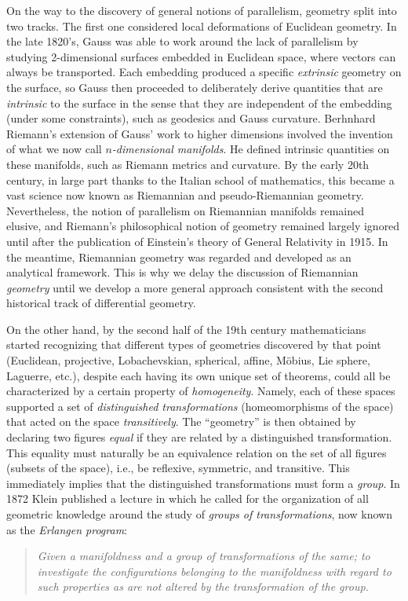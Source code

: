 \begin{hrem*}
    On the way to the discovery of general notions of parallelism, geometry split into two tracks. The first one considered local deformations of Euclidean geometry. In the late 1820's, Gauss was able to work around the lack of parallelism by studying 2-dimensional surfaces embedded in Euclidean space, where vectors can always be transported. Each embedding produced a specific \emph{extrinsic} geometry on the surface, so Gauss then proceeded to deliberately derive quantities that are \emph{intrinsic} to the surface in the sense that they are independent of the embedding (under some constraints), such as geodesics and Gauss curvature. Berhnhard Riemann's extension of Gauss' work to higher dimensions involved the invention of what we now call \emph{$n$-dimensional manifolds}. He defined intrinsic quantities on these manifolds, such as Riemann metrics and curvature. By the early 20th century, in large part thanks to the Italian school of mathematics, this became a vast science now known as Riemannian and pseudo-Riemannian geometry. Nevertheless, the notion of parallelism on Riemannian manifolds remained elusive, and Riemann's philosophical notion of geometry remained largely ignored until after the publication of Einstein's theory of General Relativity in 1915. In the meantime, Riemannian geometry was regarded and developed as an analytical framework. This is why we delay the discussion of Riemannian \emph{geometry} until we develop a more general approach consistent with the second historical track of differential geometry.

    On the other hand, by the second half of the 19th century mathematicians started recognizing that different types of geometries discovered by that point (Euclidean, projective, Lobachevskian, spherical, affine, M\"obius, Lie sphere, Laguerre, etc.), despite each having its own unique set of theorems, could all be characterized by a certain property of \emph{homogeneity}. Namely, each of these spaces supported a set of \emph{distinguished transformations} (homeomorphisms of the space) that acted on the space \emph{transitively}. The ``geometry'' is then obtained by declaring two figures \emph{equal} if they are related by a distinguished transformation. This equality must naturally be an equivalence relation on the set of all figures (subsets of the space), i.e., be reflexive, symmetric, and transitive. This immediately implies that the distinguished transformations must form a \emph{group}. In 1872 Klein published a lecture in which he called for the organization of all geometric knowledge around the study of \emph{groups of transformations}, now known as the \emph{Erlangen program}:
    \begin{quote}
        \small
        \emph{Given a manifoldness and a group of transformations of the same; to investigate the configurations belonging to the manifoldness with regard to such properties as are not altered by the transformation of the group.}
        

\end{quote}
\end{hrem*}
